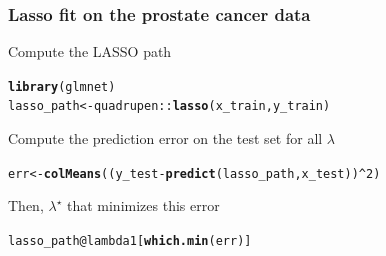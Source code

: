 \documentclass[10pt, c, xcolor=x11names]{beamer}\usepackage[]{graphicx}\usepackage[]{color}
\makeatletter
\newcommand{\hlnum}[1]{\textcolor[rgb]{0.686,0.059,0.569}{#1}}%
\newcommand{\hlopt}[1]{\textcolor[rgb]{0,0,0}{#1}}%
\newcommand{\hlstd}[1]{\textcolor[rgb]{0.345,0.345,0.345}{#1}}%
\newcommand{\hlkwb}[1]{\textcolor[rgb]{0.69,0.353,0.396}{#1}}%
\newcommand{\hlkwc}[1]{\textcolor[rgb]{0.333,0.667,0.333}{#1}}%
\newcommand{\hlkwd}[1]{\textcolor[rgb]{0.737,0.353,0.396}{\textbf{#1}}}%
\newenvironment{kframe}{%
 \def\at@end@of@kframe{}%
 \ifinner\ifhmode%
  \def\at@end@of@kframe{\end{minipage}}%
  \begin{minipage}{\columnwidth}%
 \fi\fi%
 \def\FrameCommand##1{\hskip\@totalleftmargin \hskip-\fboxsep
 \colorbox{shadecolor}{##1}\hskip-\fboxsep
     \hskip-\linewidth \hskip-\@totalleftmargin \hskip\columnwidth}%
 \MakeFramed {\advance\hsize-\width
   \@totalleftmargin\z@ \linewidth\hsize
   \@setminipage}}%
 {\par\unskip\endMakeFramed%
 \at@end@of@kframe}
\newenvironment{knitrout}{}{} %
\makeatother
\begin{document}
\begin{frame}
  \frametitle{Lasso fit on the prostate cancer data}

  \vfill
Compute the LASSO path
\begin{knitrout}\scriptsize
{}\color{fgcolor}\begin{kframe}
\begin{alltt}
\hlkwd{library}\hlstd{(glmnet)}
\hlstd{lasso_path} \hlkwb{<-} \hlstd{quadrupen}\hlopt{::}\hlkwd{lasso}\hlstd{(x_train,y_train)}
\end{alltt}


{\ttfamily\noindent\bfseries\color{errorcolor}{\#\# Error: 'lasso' is not an exported object from 'namespace:quadrupen'}}\end{kframe}
\end{knitrout}

\vfill

Compute the prediction error on the test set for all $\lambda$

\begin{knitrout}\scriptsize
{}\color{fgcolor}\begin{kframe}
\begin{alltt}
\hlstd{err} \hlkwb{<-} \hlkwd{colMeans}\hlstd{((y_test} \hlopt{-} \hlkwd{predict}\hlstd{(lasso_path, x_test))}\hlopt{^}\hlnum{2}\hlstd{)}
\end{alltt}


{\ttfamily\noindent\bfseries\color{errorcolor}{\#\# Error in predict(lasso\_path, x\_test): object 'lasso\_path' not found}}\end{kframe}
\end{knitrout}

\vfill

Then, $\lambda^\star$ that minimizes this error
\begin{knitrout}\scriptsize
{}\color{fgcolor}\begin{kframe}
\begin{alltt}
\hlstd{lasso_path}\hlopt{@}\hlkwc{lambda1}\hlstd{[}\hlkwd{which.min}\hlstd{(err)]}
\end{alltt}


{\ttfamily\noindent\bfseries\color{errorcolor}{\#\# Error in eval(expr, envir, enclos): object 'lasso\_path' not found}}\end{kframe}
\end{knitrout}


\end{frame}
\end{document}
